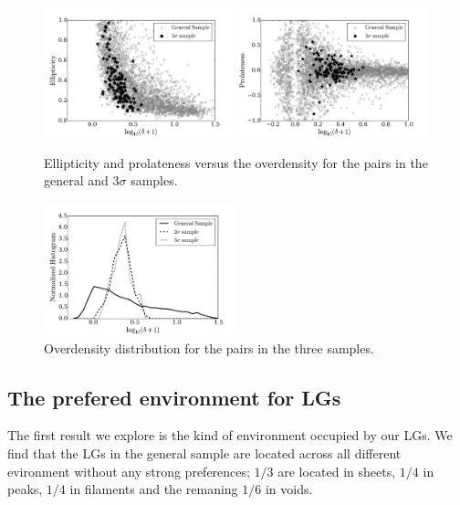 \documentclass{emulateapj}
\begin{document}
\begin{figure}
\begin{center}
  \includegraphics[width=0.49\textwidth]{ELL_delta_scatter.pdf}
  \includegraphics[width=0.49\textwidth]{PROL_delta_scatter.pdf}
\end{center}
\caption{Ellipticity and prolateness versus the overdensity for the pairs
in the general and $3\sigma$ samples. \label{fig:delta_ELL_PROL}} 
\end{figure}


\begin{figure}
\begin{center}
  \includegraphics[width=0.50\textwidth]{density_histogram.pdf}
\end{center}
\caption{Overdensity distribution for the pairs in the three samples.
    \label{fig:density}}  
\end{figure}


\subsection{The prefered environment for LGs}

The first result we explore is the kind of environment occupied by
our LGs. We find that the LGs in the general sample are located across
all different evironment without any strong preferences; $1/3$  are
located in sheets, $1/4$ in peaks, $1/4$ in filaments and the remaning
$1/6$ in voids. 
\end{document}
